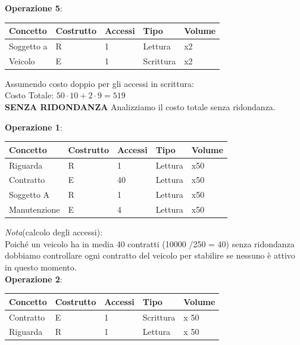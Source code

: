 \documentclass[10pt,a4paper]{article}
\begin{document}
\noindent
\textbf{Operazione 5}:
\begin{table} [H]
\centering
\begin{tabular}{|p{2cm}|p{2cm}|p{2cm}|p{2cm}|p{1.5cm}|}
\hline
\textbf{Concetto} & \textbf{Costrutto} & \textbf{Accessi} & \textbf{Tipo} & \textbf{Volume} \\
\hline
Soggetto a & R & 1 & Lettura & x2 \\
\hline
Veicolo & E & 1 & Scrittura & x2 \\
\hline
\end{tabular}
\end{table}
\noindent
Assumendo costo doppio per gli accessi in scrittura:\\
Costo Totale: $50\cdot10 + 2\cdot9 = 519$
\\
\noindent
\textbf{SENZA RIDONDANZA} Analizziamo il costo totale senza ridondanza.


\noindent
\textbf{Operazione 1}:
\begin{table} [h!]
\centering
\begin{tabular}{|p{2cm}|p{2cm}|p{2cm}|p{2cm}|p{1.5cm}|}
\hline
\textbf{Concetto} & \textbf{Costrutto} & \textbf{Accessi} & \textbf{Tipo} & \textbf{Volume} \\
\hline
Riguarda & R & 1 & Lettura & x50 \\
\hline
Contratto & E & 40 & Lettura & x50 \\
\hline
Soggetto A & R & 1 & Lettura & x50 \\
\hline
Manutenzione & E & 4 & Lettura & x50 \\
\hline
\end{tabular}
\end{table}

\noindent
\textit{Nota}(calcolo degli accessi):\\
Poiché un veicolo ha in media 40 contratti (10000 /250 = 40) senza ridondanza dobbiamo controllare ogni contratto del veicolo per stabilire se nessuno è attivo in questo momento.\\
\noindent
\textbf{Operazione 2}:
\begin{table} [h!]
\centering
\begin{tabular}{|p{2cm}|p{2cm}|p{2cm}|p{2cm}|p{1.5cm}|}
\hline
\textbf{Concetto} & \textbf{Costrutto} & \textbf{Accessi} & \textbf{Tipo} & \textbf{Volume} \\
\hline
Contratto & E & 1 & Scrittura & x 50 \\
\hline
Riguarda & R & 1 & Lettura & x 50 \\
\hline
\end{tabular}
\end{table}
\end{document}
